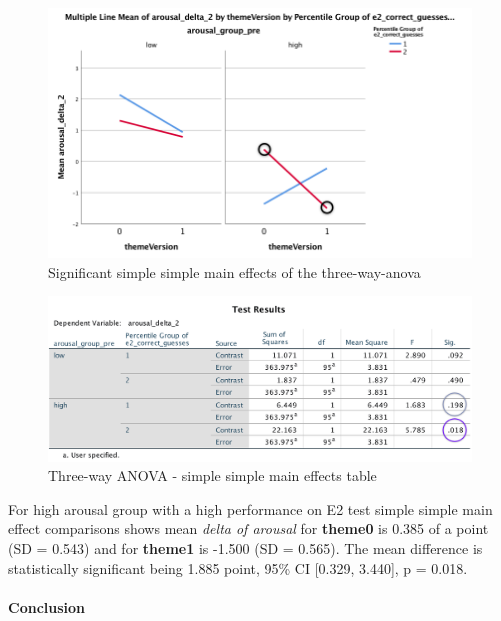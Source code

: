 	
\begin{figure}
	\centering
	\includegraphics[width=1\linewidth]{graphics/H02-simple-simple-main-effects-highlighted}
	\caption{Significant simple simple main effects of the three-way-anova}
	\label{fig:h02-simple-simple-main-effects-highlighted}
\end{figure}
	
\begin{figure}
	\centering
	\includegraphics[width=1\linewidth]{graphics/H02-simple-simple-main-effects-test-results-table}
	\caption{Three-way ANOVA - simple simple main effects table}
	\label{fig:h02-simple-simple-main-effects-test-results-table}
\end{figure}

	For high arousal group with a high performance on E2 test simple simple main effect comparisons shows mean \textit{delta of arousal} for \textbf{theme0} is 0.385 of a point (SD = 0.543) and for \textbf{theme1} is -1.500 (SD = 0.565). The mean difference is statistically significant being 1.885 point, 95\% CI [0.329, 3.440], p = 0.018.
	
	\paragraph{Conclusion}
	
